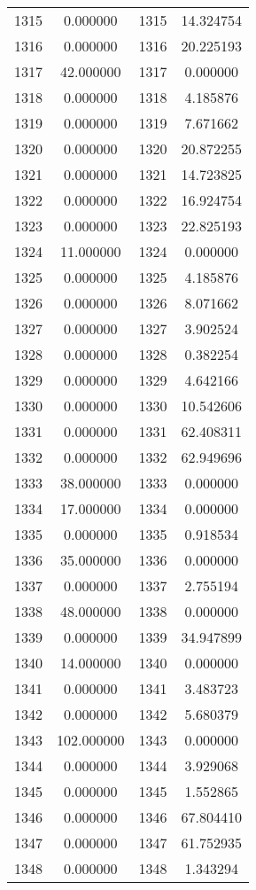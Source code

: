 \documentclass[12pt]{article}
\begin{document}
\begin{longtable}{@{}cccc@{}}
1315 & 0.000000 & 1315 & 14.324754 \\
1316 & 0.000000 & 1316 & 20.225193 \\
1317 & 42.000000 & 1317 & 0.000000 \\
1318 & 0.000000 & 1318 & 4.185876 \\
1319 & 0.000000 & 1319 & 7.671662 \\
1320 & 0.000000 & 1320 & 20.872255 \\
1321 & 0.000000 & 1321 & 14.723825 \\
1322 & 0.000000 & 1322 & 16.924754 \\
1323 & 0.000000 & 1323 & 22.825193 \\
1324 & 11.000000 & 1324 & 0.000000 \\
1325 & 0.000000 & 1325 & 4.185876 \\
1326 & 0.000000 & 1326 & 8.071662 \\
1327 & 0.000000 & 1327 & 3.902524 \\
1328 & 0.000000 & 1328 & 0.382254 \\
1329 & 0.000000 & 1329 & 4.642166 \\
1330 & 0.000000 & 1330 & 10.542606 \\
1331 & 0.000000 & 1331 & 62.408311 \\
1332 & 0.000000 & 1332 & 62.949696 \\
1333 & 38.000000 & 1333 & 0.000000 \\
1334 & 17.000000 & 1334 & 0.000000 \\
1335 & 0.000000 & 1335 & 0.918534 \\
1336 & 35.000000 & 1336 & 0.000000 \\
1337 & 0.000000 & 1337 & 2.755194 \\
1338 & 48.000000 & 1338 & 0.000000 \\
1339 & 0.000000 & 1339 & 34.947899 \\
1340 & 14.000000 & 1340 & 0.000000 \\
1341 & 0.000000 & 1341 & 3.483723 \\
1342 & 0.000000 & 1342 & 5.680379 \\
1343 & 102.000000 & 1343 & 0.000000 \\
1344 & 0.000000 & 1344 & 3.929068 \\
1345 & 0.000000 & 1345 & 1.552865 \\
1346 & 0.000000 & 1346 & 67.804410 \\
1347 & 0.000000 & 1347 & 61.752935 \\
1348 & 0.000000 & 1348 & 1.343294 \\

\end{longtable}
\end{document}
